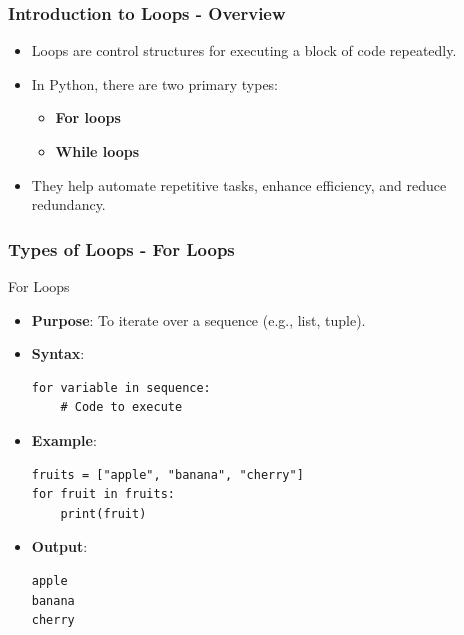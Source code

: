 \documentclass{beamer}
\begin{document}
\begin{frame}[fragile]
    \frametitle{Introduction to Loops - Overview}
    \begin{itemize}
        \item Loops are control structures for executing a block of code repeatedly.
        \item In Python, there are two primary types:
        \begin{itemize}
            \item \textbf{For loops}
            \item \textbf{While loops}
        \end{itemize}
        \item They help automate repetitive tasks, enhance efficiency, and reduce redundancy.
    \end{itemize}
\end{frame}

\begin{frame}[fragile]
    \frametitle{Types of Loops - For Loops}
    \begin{block}{For Loops}
        \begin{itemize}
            \item \textbf{Purpose}: To iterate over a sequence (e.g., list, tuple).
            \item \textbf{Syntax}:
            \begin{lstlisting}
for variable in sequence:
    # Code to execute
            \end{lstlisting}
            \item \textbf{Example}:
            \begin{lstlisting}
fruits = ["apple", "banana", "cherry"]
for fruit in fruits:
    print(fruit)
            \end{lstlisting}
            \item \textbf{Output}:
            \begin{lstlisting}
apple
banana
cherry
            \end{lstlisting}
        \end{itemize}
    \end{block}
\end{frame}
\end{document}
